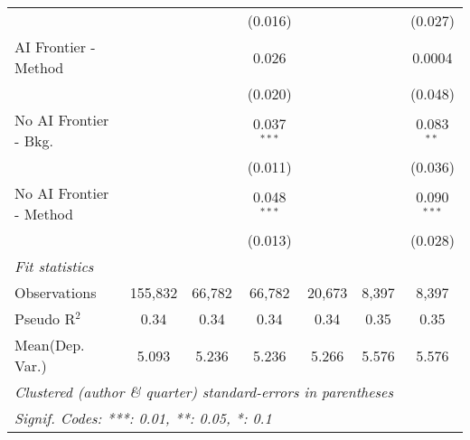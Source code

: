 \begin{tabular}{lcccccc}
                           &               &               & (0.016)       &               &               & (0.027)\\   
   AI Frontier - Method    &               &               & 0.026         &               &               & 0.0004\\   
                           &               &               & (0.020)       &               &               & (0.048)\\   
   No AI Frontier - Bkg.   &               &               & 0.037$^{***}$ &               &               & 0.083$^{**}$\\   
                           &               &               & (0.011)       &               &               & (0.036)\\   
   No AI Frontier - Method &               &               & 0.048$^{***}$ &               &               & 0.090$^{***}$\\   
                           &               &               & (0.013)       &               &               & (0.028)\\   
   \midrule
   \emph{Fit statistics}\\
   Observations            & 155,832       & 66,782        & 66,782        & 20,673        & 8,397         & 8,397\\  
   Pseudo R$^2$            & 0.34          & 0.34          & 0.34          & 0.34          & 0.35          & 0.35\\  
Mean(Dep. Var.) & 5.093 & 5.236 & 5.236 & 5.266 & 5.576 & 5.576 \\
   \midrule \midrule
   \multicolumn{7}{l}{\emph{Clustered (author \& quarter) standard-errors in parentheses}}\\
   \multicolumn{7}{l}{\emph{Signif. Codes: ***: 0.01, **: 0.05, *: 0.1}}\\
\end{tabular}
\par\endgroup
